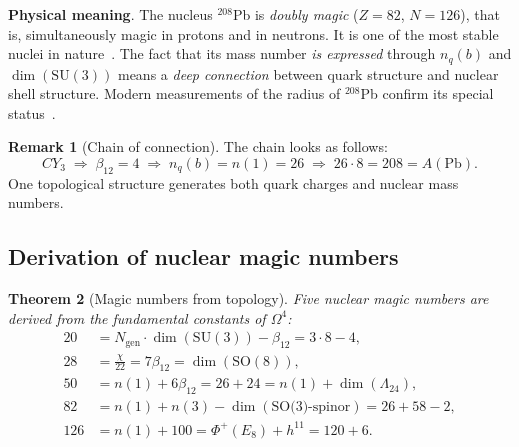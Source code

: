 \documentclass[11pt,a4paper]{article}
\newcommand{\SU}{\ensuremath{\mathrm{SU}}}
\newcommand{\SO}{\ensuremath{\mathrm{SO}}}
\newcommand{\CY}{\ensuremath{CY_3}}
\newcommand{\Om}{\ensuremath{\Omega^4}}
\newcommand{\Ngen}{\ensuremath{N_{\text{gen}}}}
\newtheorem{theorem}{Theorem}[section]
\theoremstyle{definition}
\newtheorem{remark}[theorem]{Remark}
\begin{document}
\medskip\noindent
\textbf{Physical meaning}.
The nucleus $^{208}$Pb is \emph{doubly magic} ($Z = 82$, $N = 126$),
that is, simultaneously magic in protons and in neutrons.
It is one of the most stable nuclei in nature~\cite{magic-numbers, bohr-mottelson}.
The fact that its mass number \emph{is expressed} through
$n_q(b)$ and $\dim(\SU(3))$ means a \emph{deep connection}
between quark structure and nuclear shell structure.
Modern measurements of the radius of $^{208}$Pb confirm
its special status~\cite{pb208-review}.

\begin{remark}[Chain of connection]
\label{rem:b-quark-chain}
The chain looks as follows:
\begin{equation}
    \CY \;\Rightarrow\; \beta_{12} = 4
    \;\Rightarrow\; n_q(b) = n(1) = 26
    \;\Rightarrow\; 26 \cdot 8 = 208 = A(\text{Pb}).
\end{equation}
One topological structure generates both quark charges
and nuclear mass numbers.
\end{remark}

\subsection{Derivation of nuclear magic numbers}
\label{subsec:magic-numbers}

\begin{theorem}[Magic numbers from topology]
\label{thm:magic-numbers}
Five nuclear magic numbers are derived from the fundamental
constants of $\Om$:
\begin{align}
    20  &= \Ngen \cdot \dim(\SU(3)) - \beta_{12}
          = 3 \cdot 8 - 4, \label{eq:magic-20} \\[0.3em]
    28  &= \frac{\chi}{22} = 7 \beta_{12}
          = \dim(\SO(8)), \label{eq:magic-28} \\[0.3em]
    50  &= n(1) + 6 \beta_{12}
          = 26 + 24 = n(1) + \dim(\Lambda_{24}), \label{eq:magic-50} \\[0.3em]
    82  &= n(1) + n(3) - \dim(\text{SO(3)-spinor})
          = 26 + 58 - 2, \label{eq:magic-82} \\[0.3em]
    126 &= n(1) + 100 = \Phi^+(E_8) + h^{11}
          = 120 + 6. \label{eq:magic-126}
\end{align}
\end{theorem}
\end{document}
